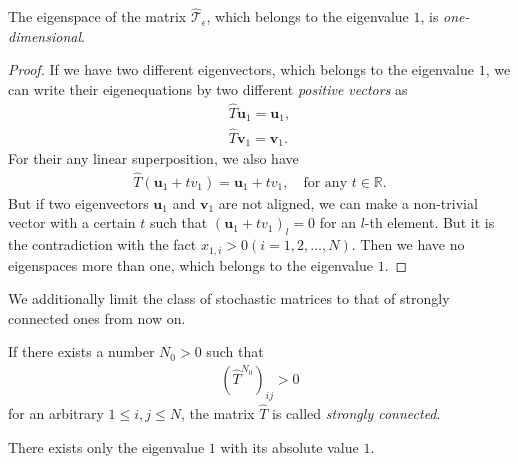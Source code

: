 \begin{theorem}
	The eigenspace of the matrix $\hat{\mathcal{T}}_{\epsilon}$, which belongs to the eigenvalue $1$, is \textit{one-dimensional}. 
\end{theorem}

\begin{proof}
	If we have two different eigenvectors, which belongs to the eigenvalue $1$, we can write their eigenequations by two different \textit{positive vectors} as
	\begin{align}
	\hat{T}\bm{u}_{1} = \bm{u}_{1},\\
	\hat{T}\bm{v}_{1} = \bm{v}_{1}.
	\end{align}
	For their any linear superposition, we also have
	\begin{align}
	\hat{T}(\bm{u}_{1} + t{v}_{1}) = \bm{u}_{1} + t{v}_{1},\quad\text{for any $t\in\mathbb{R}$}.
	\end{align}
	But if two eigenvectors $\bm{u}_{1}$ and $\bm{v}_{1}$ are not aligned, we can make a non-trivial vector with a certain $t$ such that $\left(\bm{u}_{1} + t{v}_{1}\right)_{l} = 0$ for an $l$-th element. But it is the contradiction with the fact $x_{1,i}>0(i=1,2,\dots,N)$. Then we have no eigenspaces more than one, which belongs to the eigenvalue $1$.
\end{proof}

We additionally limit the class of stochastic matrices to that of strongly connected ones from now on.
\begin{definition}
	If there exists a number $N_{0}>0$ such that
	\begin{align}
	\left(\hat{T}^{N_{0}}\right)_{ij}>0
	\end{align}
	for an arbitrary $1\leq i,j\leq N$, the matrix $\hat{T}$ is called \textit{strongly connected}.
\end{definition}

\begin{theorem}
	There exists only the eigenvalue $1$ with its absolute value $1$.
\end{theorem}

